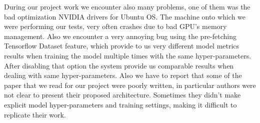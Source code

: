 During our project work we encounter also many problems, one of them was the bad optimization NVIDIA drivers for Ubuntu OS. The machine onto which we were performing our tests, very often crashes due to bad GPU's memory management. Also we encounter a very annoying bug using the pre-fetching Tensorflow Dataset feature, which provide to us very different model metrics results when training the model multiple times with the same hyper-parameters. After disabling that option the system provide us comparable results when dealing with same hyper-parameters. Also we have to report that some of the paper that we read for our project were poorly written, in particular authors were not clear to present their proposed architecture. Sometimes they didn't make explicit model hyper-parameters and training settings, making it difficult to replicate their work.
